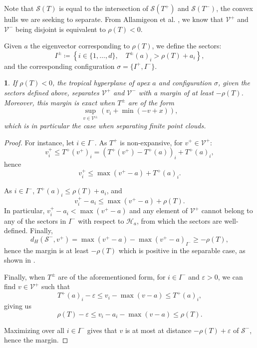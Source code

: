 \documentclass[oneside,UKenglish,a4paper]{amsart}
\numberwithin{equation}{section}
\numberwithin{figure}{section}
\theoremstyle{plain}
\theoremstyle{definition}
\theoremstyle{plain}
\newtheorem{prop}[thm]{\protect\propositionname}
\theoremstyle{remark}
\theoremstyle{plain}
\theoremstyle{definition}
\theoremstyle{definition}
\providecommand{\propositionname}{Proposition}
\begin{document}
Note that $\mathcal{S}(T)$ is equal to the intersection of $\mathcal{S}(T^{+})$ and $\mathcal{S}(T^{-})$, the convex hulls we are seeking to separate.
From Allamigeon et al. \cite{Allamigeon2018}, we know that $\mathcal{V}^{+}$
and $\mathcal{V^{-}}$ being disjoint is equivalent to $\rho(T)<0$.

Given $a$ the eigenvector corresponding to $\rho(T)$, we define the sectors:
\[
I^{\pm}\coloneqq\left\{i\in\{1,\ldots, d\},\quad T^{\pm}(a)_{i}>\rho(T)+a_{i}\right\},
\]
and the corresponding configuration $\sigma=\{I^{+},I^{-}\}$.

\begin{prop} \label{prop:BinaryHardMargin}
If $\rho(T) < 0$, the tropical hyperplane of apex $a$ and configuration $\sigma$, given the sectors defined
above, separates $\mathcal{V}^{+}$ and $\mathcal{V}^{-}$ with a
margin of at least $-\rho(T)$. Moreover, this margin is exact when $T^{\pm}$
are of the form
\[
\sup_{v\in\mathcal{V}^{\pm}}\left(v_{i}+\min(-v+x)\right),
\]
which is in particular the case when separating finite point clouds.
\end{prop}

\begin{proof}
For instance, let $i\in I^{-}$. As $T^{+}$ is non-expansive, for $v^{+}\in \mathcal{V}^{+}$:
\[
v_{i}^{+}\le T^{+}(v^{+})_{i}=\left(T^{+}(v^{+})-T^{+}(a)\right)_{i}+T^{+}(a)_{i},
\]
hence 
\begin{equation*}
v_{i}^{+}\le\max(v^{+}-a)+T^{+}(a)_{i}.
\end{equation*}

As $i\in I^-$, $T^{+}(a)_{i}\le \rho(T)+a_{i}$,
and
\[
v_{i}^{+}-a_{i}\le\max(v^{+}-a)+\rho(T).
\]
In particular, $v_{i}^{+}-a_{i}<\max(v^{+}-a)$ and any element of
$\mathcal{V}^{+}$ cannot belong to any of the sectors in $I^{-}$ with
respect to $\mathcal{H}_{a}$, from which the sectors are well-defined.
Finally, 
\[
d_H(\mathcal{S}^-,v^{+})=\max(v^{+}-a)-\max(v^{+}-a)_{I^{-}}\ge-\rho(T),
\]
hence the margin is at least $-\rho(T)$ which is positive in the separable case, as shown in \cite{Allamigeon2018}.

Finally, when $T^{\pm}$
are of the aforementioned form, for  $i\in I^{-}$ and $\varepsilon>0$, we can
find $v\in \mathcal{V}^{+}$ such that 
\[
T^{+}(a)_{i}-\varepsilon\le v_{i}-\max(v-a)\le T^{+}(a)_{i},
\]
giving us 
\[
\rho(T)-\varepsilon\le v_{i}-a_{i}-\max(v-a)\le\rho(T).
\]

Maximizing over all $i\in I^{-}$ gives that $v$ is
at most at distance $-\rho(T)+\varepsilon$ of $\mathcal{S}^-$, hence
the margin.
\end{proof}
\end{document}
